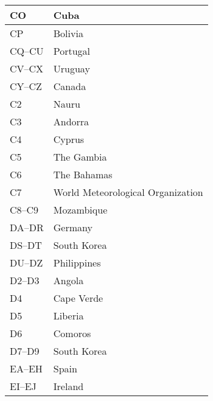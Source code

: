 \begin{longtable}{|l|l|}
  \hline
  CO                  & Cuba                                      \\
  \hline
  CP                  & Bolivia                                   \\
  \hline
  CQ--CU              & Portugal                                  \\
  \hline
  CV--CX              & Uruguay                                   \\
  \hline
  CY--CZ              & Canada                                    \\
  \hline
  C2                  & Nauru                                     \\
  \hline
  C3                  & Andorra                                   \\
  \hline
  C4                  & Cyprus                                    \\
  \hline
  C5                  & The Gambia                                \\
  \hline
  C6                  & The Bahamas                               \\
  \hline
  C7                  & World Meteorological Organization         \\
  \hline
  C8--C9              & Mozambique                                \\
  \hline
  DA--DR              & Germany                                   \\
  \hline
  DS--DT              & South Korea                               \\
  \hline
  DU--DZ              & Philippines                               \\
  \hline
  D2--D3              & Angola                                    \\
  \hline
  D4                  & Cape Verde                                \\
  \hline
  D5                  & Liberia                                   \\
  \hline
  D6                  & Comoros                                   \\
  \hline
  D7--D9              & South Korea                               \\
  \hline
  EA--EH              & Spain                                     \\
  \hline
  EI--EJ              & Ireland                                   \\
  \hline

\end{longtable}
